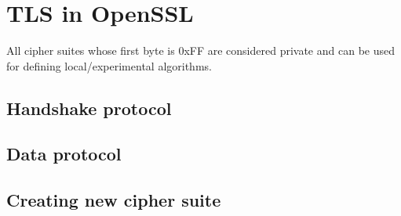 \chapter{TLS in OpenSSL}


All cipher suites whose first byte is 0xFF are considered private and can be used for defining local/experimental algorithms. \cite[p.~55]{rfc2246}



\section{Handshake protocol}

\section{Data protocol}

\section{Creating new cipher suite}
